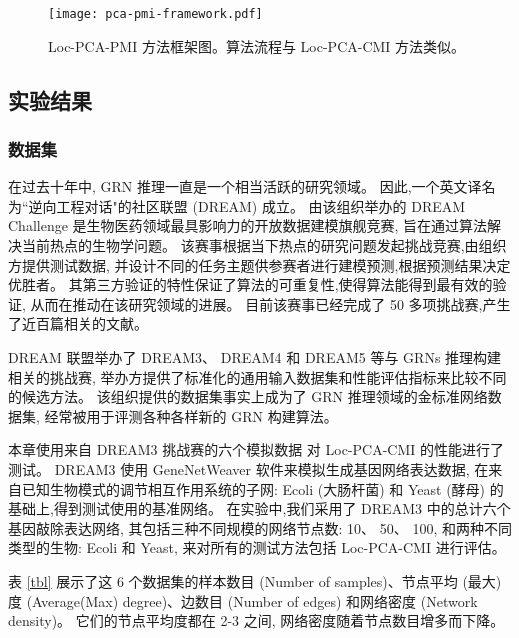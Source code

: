 \begin{figure}[!htbp]
  \centering
  \texttt{[image: pca-pmi-framework.pdf]}
  \caption{Loc-PCA-PMI 方法框架图。算法流程与 Loc-PCA-CMI 方法类似。}
  \label{pca-pmi-fr}
\end{figure}


\subsection{实验结果}

\subsubsection{数据集}

在过去十年中, GRN 推理一直是一个相当活跃的研究领域。
因此,一个英文译名为``逆向工程对话"的社区联盟 (DREAM)  成立。
由该组织举办的 DREAM Challenge 是生物医药领域最具影响力的开放数据建模旗舰竞赛,
旨在通过算法解决当前热点的生物学问题。
该赛事根据当下热点的研究问题发起挑战竞赛,由组织方提供测试数据,
并设计不同的任务主题供参赛者进行建模预测,根据预测结果决定优胜者。
其第三方验证的特性保证了算法的可重复性,使得算法能得到最有效的验证,
从而在推动在该研究领域的进展。
目前该赛事已经完成了 50 多项挑战赛,产生了近百篇相关的文献。

DREAM 联盟举办了 DREAM3、
DREAM4 和 DREAM5 等与 GRNs 推理构建相关的挑战赛, 
举办方提供了标准化的通用输入数据集和性能评估指标来比较不同的候选方法。
该组织提供的数据集事实上成为了 GRN 推理领域的金标准网络数据集,
经常被用于评测各种各样新的 GRN 构建算法。

本章使用来自 DREAM3 挑战赛的六个模拟数据  对 Loc-PCA-CMI 的性能进行了测试。
 DREAM3 使用 GeneNetWeaver 软件来模拟生成基因网络表达数据,
在来自已知生物模式的调节相互作用系统的子网:
 Ecoli (大肠杆菌) 和 Yeast (酵母) 的基础上,得到测试使用的基准网络。 
在实验中,我们采用了 DREAM3 中的总计六个基因敲除表达网络,
其包括三种不同规模的网络节点数:
 10、 50、 100, 和两种不同类型的生物: Ecoli 和 Yeast, 
来对所有的测试方法包括 Loc-PCA-CMI 进行评估。

表 \ref{tbl} 展示了这 6 个数据集的样本数目 (Number of samples)、节点平均 (最大)度 (Average(Max) degree)、边数目 (Number of edges) 和网络密度 (Network density)。
它们的节点平均度都在 2-3 之间, 网络密度随着节点数目增多而下降。

